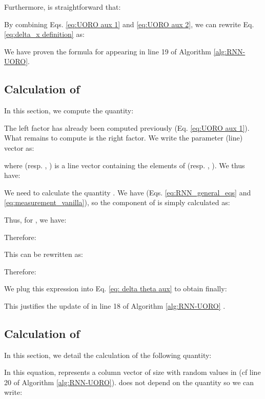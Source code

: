 \documentclass[twocolumn,a4paper]{svjour3} \sloppy          \smartqed
\begin{document}
Furthermore, is straightforward that:


By combining Eqs. \ref{eq:UORO aux 1} and \ref{eq:UORO aux 2}, we can rewrite Eq. \ref{eq:delta_x definition} as:


We have proven the formula for  appearing in line 19 of Algorithm \ref{alg:RNN-UORO}.

\subsection{Calculation of }
\label{section: calculation of delta theta}

In this section, we compute the quantity:
 

The left factor has already been computed previously (Eq. \ref{eq:UORO aux 1}). What remains to compute is the right factor. We write the parameter (line) vector as:



where  (resp. , ) is a line vector containing the elements of  (resp. , ). We thus have:



We need to calculate the quantity . We have  (Eqs. \ref{eq:RNN_general_eqs} and \ref{eq:measurement_vanilla}), so the  component of  is simply calculated as:



Thus, for , we have:
 

Therefore:


This can be rewritten as:


Therefore:


We plug this expression into Eq. \ref{eq: delta theta aux} to obtain finally: 
 

This justifies the update of  in line 18 of Algorithm \ref{alg:RNN-UORO} \footnotemark.



\subsection{Calculation of }

In this section, we detail the calculation of the following quantity:



In this equation,  represents a column vector of size  with random values in  (cf line 20 of Algorithm \ref{alg:RNN-UORO}).  does not depend on the quantity  so we can write:
\end{document}
